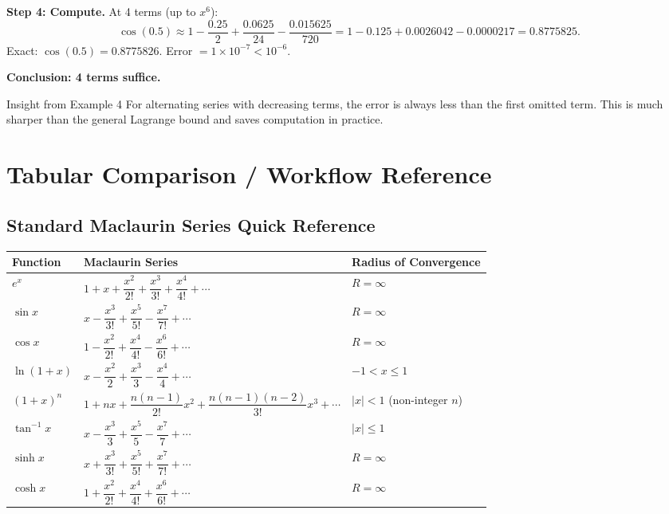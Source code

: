 \documentclass[12pt,a4paper]{article}
\begin{document}
\textbf{Step 4: Compute.}
At 4 terms (up to \(x^6\)):
\[
  \cos(0.5) \approx 1 - \frac{0.25}{2} + \frac{0.0625}{24} - \frac{0.015625}{720}
           = 1 - 0.125 + 0.0026042 - 0.0000217
           = 0.8775825.
\]
Exact: \(\cos(0.5) = 0.8775826\).  Error \(= 1\times10^{-7} < 10^{-6}\). \checkmark

\textbf{Conclusion: 4 terms suffice.}

\begin{learnbox}{Insight from Example 4}
For alternating series with decreasing terms, the error is always less than the
first omitted term.
This is much sharper than the general Lagrange bound and saves computation in
practice.
\end{learnbox}

\section{Tabular Comparison / Workflow Reference}

\subsection*{Standard Maclaurin Series Quick Reference}

\begin{center}
\begin{tabular}{p{3cm} p{7.5cm} p{3cm}}
\toprule
\textbf{Function} & \textbf{Maclaurin Series} & \textbf{Radius of Convergence} \\
\midrule
$e^x$ &
$1 + x + \dfrac{x^2}{2!} + \dfrac{x^3}{3!} + \dfrac{x^4}{4!} + \cdots$ &
$R = \infty$ \\[8pt]
$\sin x$ &
$x - \dfrac{x^3}{3!} + \dfrac{x^5}{5!} - \dfrac{x^7}{7!} + \cdots$ &
$R = \infty$ \\[8pt]
$\cos x$ &
$1 - \dfrac{x^2}{2!} + \dfrac{x^4}{4!} - \dfrac{x^6}{6!} + \cdots$ &
$R = \infty$ \\[8pt]
$\ln(1+x)$ &
$x - \dfrac{x^2}{2} + \dfrac{x^3}{3} - \dfrac{x^4}{4} + \cdots$ &
$-1 < x \leq 1$ \\[8pt]
$(1+x)^n$ &
$1 + nx + \dfrac{n(n-1)}{2!}x^2 + \dfrac{n(n-1)(n-2)}{3!}x^3 + \cdots$ &
$|x| < 1$ (non-integer $n$) \\[8pt]
$\tan^{-1} x$ &
$x - \dfrac{x^3}{3} + \dfrac{x^5}{5} - \dfrac{x^7}{7} + \cdots$ &
$|x| \leq 1$ \\[8pt]
$\sinh x$ &
$x + \dfrac{x^3}{3!} + \dfrac{x^5}{5!} + \dfrac{x^7}{7!} + \cdots$ &
$R = \infty$ \\[8pt]
$\cosh x$ &
$1 + \dfrac{x^2}{2!} + \dfrac{x^4}{4!} + \dfrac{x^6}{6!} + \cdots$ &
$R = \infty$ \\
\bottomrule
\end{tabular}
\end{center}
\end{document}
